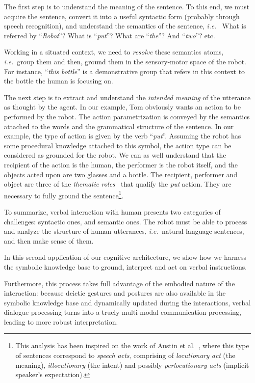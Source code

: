 \documentclass{svmult}
\newcommand{\ie}{{\textit{i.e.~}}}
\begin{document}
The first step is to understand the meaning of the sentence. To this end, we
must acquire the sentence, convert it into a useful syntactic form (probably
through speech recognition), and understand the semantics of the sentence, \ie
What is referred by ``\textit{Robot}''? What is ``\textit{put}''? What are
``\textit{the}''? And ``\textit{two}''? etc.

Working in a situated context, we need to \emph{resolve} these semantics atoms,
\ie group them and then, ground them in the sensory-motor space of the robot. For instance,
``\textit{this bottle}'' is a demonstrative group that refers in this context to the
bottle the human is focusing on.

The next step is to extract and understand the \emph{intended meaning} of the
utterance as thought by the agent. In our example, Tom obviously wants an
action to be performed by the robot. The action parametrization is conveyed by
the semantics attached to the words and the grammatical structure of the
sentence. In our example, the type of action is given by the verb
``\textit{put}''. Assuming the robot has some procedural knowledge attached to
this symbol, the action type can be considered as grounded for the robot. We
can as well understand that the recipient of the action is the human, the
performer is the robot itself, and the objects acted upon are two glasses and a bottle. The
recipient, performer and object are three of the \emph{thematic
roles}~\cite{Gruber1965} that qualify the \emph{put} action. They are
necessary to fully ground the sentence\footnote{This analysis has been inspired
on the work of Austin et al.~\cite{Austin1962}, where this type of sentences
correspond to \emph{speech acts}, comprising of \emph{locutionary act} (the
meaning), \emph{illocutionary} (the intent) and possibly \emph{perlocutionary
acts} (implicit speaker's expectation).}.

To summarize, verbal interaction with human presents two categories of challenges: syntactic
ones, and semantic ones. The robot must be able to process and analyze the
structure of human utterances, \ie natural language sentences, and then make
sense of them. 

In this second application of our cognitive architecture, we show how we
harness the symbolic knowledge base to ground, interpret and act on verbal
instructions.

Furthermore, this process takes full advantage of the embodied nature of the
interaction: because deictic gestures and postures are also available in the
symbolic knowledge base and dynamically updated during the interactions, verbal
dialogue processing turns into a truely multi-modal communication processing,
leading to more robust interpretation.
\end{document}
